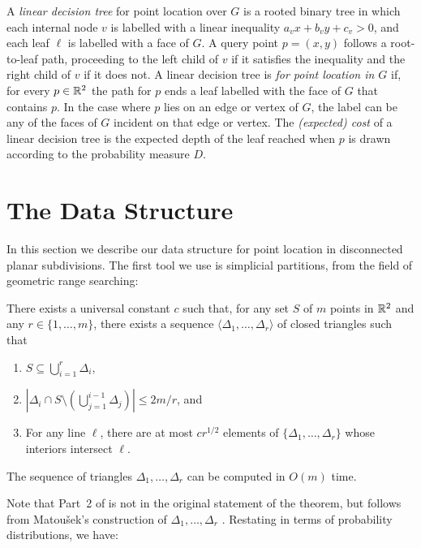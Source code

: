 \documentclass{patmorin}
\begin{document}
A \emph{linear decision tree} for point location over $G$ is a rooted
binary tree in which each internal node $v$ is labelled with a linear
inequality $a_vx + b_vy + c_v > 0$, and each leaf $\ell$ is labelled
with a face of $G$.  A query point $p=(x,y)$ follows a root-to-leaf path,
proceeding to the left child of $v$ if it satisfies the inequality and the
right child of $v$ if it does not.  A linear decision tree is \emph{for
point location in $G$} if, for every $p\in\mathbb{R}^2$ the path for $p$ ends a
leaf labelled with the face of $G$ that contains $p$. In the case where
$p$ lies on an edge or vertex of $G$, the label can be any of the faces
of $G$ incident on that edge or vertex.  The \emph{(expected) cost} of a
linear decision tree is the expected depth of the leaf reached when $p$
is drawn according to the probability measure $D$.


\section{The Data Structure}

In this section we describe our data structure for point location in
disconnected planar subdivisions.  The first tool we use is simplicial
partitions, from the field of geometric range searching:

\begin{thm}[Matou\v{s}ek 1992]
There exists a universal constant $c$ such that, for any set $S$ of $m$
points in $\mathbb{R}^2$ and any $r\in\{1,\ldots,m\}$, there exists a sequence
$\langle \Delta_1,\ldots,\Delta_r\rangle$ of closed triangles such that
  \begin{enumerate}
    \item $S\subseteq \bigcup_{i=1}^r \Delta_i$,
  
    \item $\left|\Delta_i \cap S\setminus
    \left(\bigcup_{j=1}^{i-1}\Delta_j\right)\right| \le 2m/r$, and
  
    \item For any line $\ell$, there are at most $cr^{1/2}$ elements of
  $\{\Delta_1,\ldots,\Delta_r\}$ whose interiors intersect $\ell$.
  \end{enumerate}
  The sequence of triangles $\Delta_1,\ldots,\Delta_r$ can be computed
  in $O(m)$ time.
\end{thm}

Note that Part~2 of  is not in the original
statement of the theorem, but follows from Matou\v{s}ek's construction
of $\Delta_1,\ldots,\Delta_r$ \cite{m92}.
Restating  in terms of probability distributions,
we have:
\end{document}
